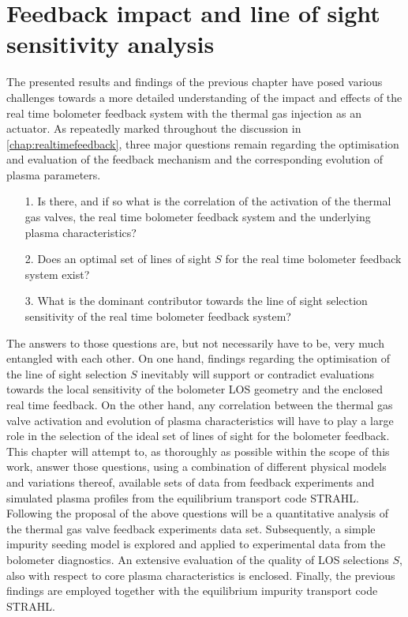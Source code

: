 %
\chapter{Feedback impact and line of sight sensitivity analysis}\label{chap:feedbackeval}%
%
    The presented results and findings of the previous chapter have posed various challenges towards a more detailed understanding of the impact and effects of the real time bolometer feedback system with the thermal gas injection as an actuator. As repeatedly marked throughout the discussion in \cref{chap:realtimefeedback}, three major questions remain regarding the optimisation and evaluation of the feedback mechanism and the corresponding evolution of plasma parameters.%
%
    \begin{enumerate}%
        \item[1.]{%
            Is there, and if so what is the correlation of the activation of the thermal gas valves, the real time bolometer feedback system and the underlying plasma characteristics?}%
        \item[2.]{%
            Does an optimal set of lines of sight $S$ for the real time bolometer feedback system exist?}%
        \item[3.]{%
            What is the dominant contributor towards the line of sight selection sensitivity of the real time bolometer feedback system?}%
    \end{enumerate}%
%
    The answers to those questions are, but not necessarily have to be, very much entangled with each other. On one hand, findings regarding the optimisation of the line of sight selection $S$ inevitably will support or contradict evaluations towards the local sensitivity of the bolometer LOS geometry and the enclosed real time feedback. On the other hand, any correlation between the thermal gas valve activation and evolution of plasma characteristics will have to play a large role in the selection of the ideal set of lines of sight for the bolometer feedback.\\%
    This chapter will attempt to, as thoroughly as possible within the scope of this work, answer those questions, using a combination of different physical models and variations thereof, available sets of data from feedback experiments and simulated plasma profiles from the equilibrium transport code STRAHL. Following the proposal of the above questions will be a quantitative analysis of the thermal gas valve feedback experiments data set. Subsequently, a simple impurity seeding model is explored and applied to experimental data from the bolometer diagnostics. An extensive evaluation of the quality of LOS selections $S$, also with respect to core plasma characteristics is enclosed. Finally, the previous findings are employed together with the equilibrium impurity transport code STRAHL.%
%
